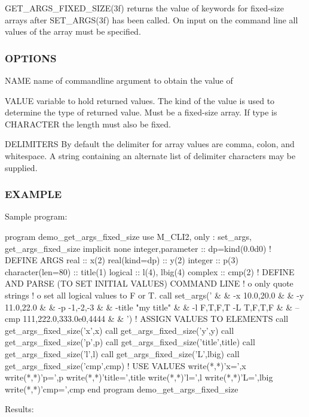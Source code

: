 \begin{DoxyVerb}GET_ARGS_FIXED_SIZE(3f) returns the value of keywords for
fixed-size arrays after SET_ARGS(3f) has been called.
On input on the command line all values of the array must
be specified.
\end{DoxyVerb}


\subsubsection*{O\+P\+T\+I\+O\+NS}

N\+A\+ME name of commandline argument to obtain the value of

V\+A\+L\+UE variable to hold returned values. The kind of the value is used to determine the type of returned value. Must be a fixed-\/size array. If type is C\+H\+A\+R\+A\+C\+T\+ER the length must also be fixed.

D\+E\+L\+I\+M\+I\+T\+E\+RS By default the delimiter for array values are comma, colon, and whitespace. A string containing an alternate list of delimiter characters may be supplied.

\subsubsection*{E\+X\+A\+M\+P\+LE}

Sample program\+: \begin{DoxyVerb}program demo_get_args_fixed_size
use M_CLI2,  only : set_args, get_args_fixed_size
implicit none
integer,parameter   :: dp=kind(0.0d0)
! DEFINE ARGS
real                :: x(2)
real(kind=dp)       :: y(2)
integer             :: p(3)
character(len=80)   :: title(1)
logical             :: l(4), lbig(4)
complex             :: cmp(2)
! DEFINE AND PARSE (TO SET INITIAL VALUES) COMMAND LINE
!   o only quote strings
!   o set all logical values to F or T.
call set_args(' &
   & -x 10.0,20.0 &
   & -y 11.0,22.0 &
   & -p -1,-2,-3 &
   & -title "my title" &
   & -l F,T,F,T -L T,F,T,F  &
   & --cmp 111,222.0,333.0e0,4444 &
   & ')
! ASSIGN VALUES TO ELEMENTS
   call get_args_fixed_size('x',x)
   call get_args_fixed_size('y',y)
   call get_args_fixed_size('p',p)
   call get_args_fixed_size('title',title)
   call get_args_fixed_size('l',l)
   call get_args_fixed_size('L',lbig)
   call get_args_fixed_size('cmp',cmp)
! USE VALUES
   write(*,*)'x=',x
   write(*,*)'p=',p
   write(*,*)'title=',title
   write(*,*)'l=',l
   write(*,*)'L=',lbig
   write(*,*)'cmp=',cmp
end program demo_get_args_fixed_size
\end{DoxyVerb}
 Results\+:

